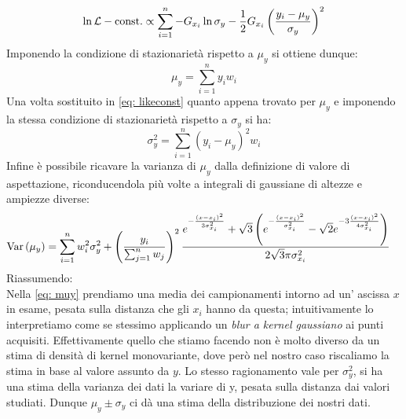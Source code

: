 \documentclass{article}[a4paper, oneside, 11pt]
\begin{document}
\begin{equation}\label{eq: likeconst}
	\ln{\mathcal L} - \text{const.} \propto \sum_{i=1}^{n} -G_{x_i} \ln{\sigma_y}
	- \frac{1}{2} G_{x_i} \left( \frac{y_i - \mu_y}{\sigma_y} \right)^2
\end{equation}
Imponendo la condizione di stazionarietà rispetto a $\mu_y$ si ottiene dunque:
\begin{equation}\label{eq: muy}
	\mu_y = \sum_{i=1}^{n} y_i w_i 
\end{equation} 
Una volta sostituito in \eqref{eq: likeconst} quanto appena trovato per $\mu_y$
e imponendo la stessa condizione di stazionarietà rispetto a $\sigma_y$ si ha:
\begin{equation}\label{eq: sigmay}
	\sigma_y^2 = \sum_{i=1}^{n} (y_i - \mu_y)^2 w_i
\end{equation}
Infine è possibile ricavare la varianza di $\mu_y$ dalla definizione di valore
di aspettazione, riconducendola più volte a integrali di gaussiane di altezze
e ampiezze diverse:
\begin{align} \label{aln: varmuy}
	\text{Var}\left(\mu_y\right) &= \sum_{i=1}^{n} w_i^2 \sigma_y^2 + 
	\left(\frac{y_i}{\sum_{j=1}^{n} w_j} \right)^2 \frac{
	e^{-\frac{(x-x_i)^2}{3 \sigma_{x_i}^2}} +  
	\sqrt{3} \left( e^{-\frac{(x-x_i)^2}{\sigma_{x_i}^2}} -
	\sqrt{2} e^{-3 \frac{(x-x_i)^2}{4 \sigma_{x_i}^2}} \right)
	} {2 \sqrt{3}\pi \sigma_{x_i}^2} 
\end{align}
Riassumendo:\\
Nella \eqref{eq: muy} prendiamo una media dei campionamenti intorno ad un'
ascissa $x$ in esame, pesata sulla distanza che gli $x_i$ hanno da questa; 
intuitivamente lo interpretiamo come se stessimo applicando un 
\emph{blur a kernel gaussiano} ai punti acquisiti.
Effettivamente quello che stiamo facendo non è molto diverso da un stima
di densità di kernel monovariante, dove però nel nostro caso
riscaliamo la stima in base al valore assunto da $y$.
Lo stesso ragionamento vale per $\sigma_y^2$, si ha una stima della varianza
dei dati la variare di y, pesata sulla distanza dai valori studiati. Dunque
$\mu_y \pm \sigma_y$ ci dà una stima della distribuzione dei nostri dati.
\end{document}

